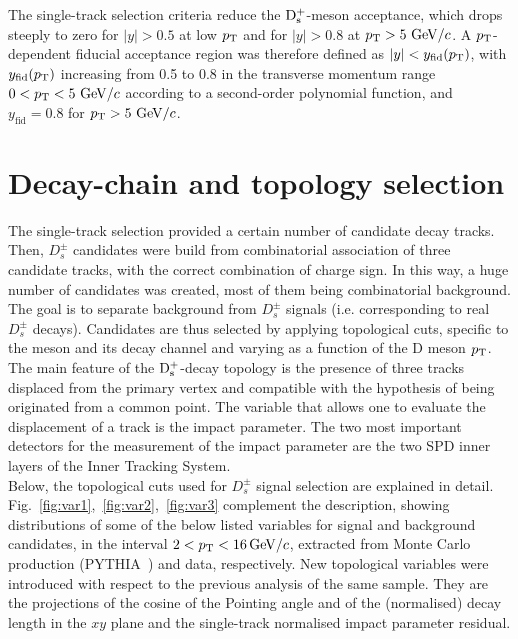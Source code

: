 The single-track selection criteria reduce the ${\rm D_s^+}$-meson acceptance, which drops 
steeply to zero for $|y| > 0.5$ at low $p_{\rm T}$ and for $|y| > 0.8$ 
at $p_{\rm T} > 5~\mathrm{GeV}/c$. A $p_{\rm T}$-dependent fiducial acceptance region was therefore defined as 
$|y| < y_{\mathrm{fid}}(p_{\rm T})$, with $y_{\mathrm{fid}}(p_{\rm T})$ increasing 
from 0.5 to 0.8 in the transverse momentum range $0 < p_{\rm T} < 5~\mathrm{GeV}/c$ 
according to a second-order polynomial function, and $y_{\mathrm{fid}}=0.8$ 
for $p_{\rm T} > 5~\mathrm{GeV}/c$.

\section{Decay-chain and topology selection}

The single-track selection provided a certain number of candidate
 decay tracks. Then, $D^{\pm}_s$ candidates were build from combinatorial 
 association of three candidate tracks, with the correct combination of charge 
 sign. In this way, a huge number of candidates was created, most of them 
 being combinatorial background. The goal is to separate background from
  $D^{\pm}_s$ signals (i.e. corresponding to real  $D^{\pm}_s$ decays). Candidates 
  are thus selected by applying topological cuts, specific to the meson and its 
  decay channel and varying as a function of the D meson $p_{\rm T}$.
The main feature of the ${\rm D_s^+}$-decay topology is the presence of three tracks displaced from 
the primary vertex and compatible with the hypothesis of being originated from 
a common point. 
The variable that allows one to evaluate the displacement of a track is the 
impact parameter. The two most important detectors for the measurement
 of the impact parameter are the two SPD inner layers of the Inner Tracking System. \\
Below, the topological cuts used for $D^{\pm}_s$ signal selection
 are explained in detail. Fig.~\ref{fig:var1},~\ref{fig:var2},~\ref{fig:var3} complement
 the description, showing distributions of some of the below listed variables
 for signal and background candidates, in the interval $2 < p_{\rm T} < 16 \, \mathrm{GeV}/c$, 
 extracted from Monte Carlo production (PYTHIA~\cite{Sjostrand:2006za}) and data, respectively.
  New topological variables were introduced with respect to the 
  previous analysis of the same sample. They are the projections of the cosine of 
the Pointing angle and of the (normalised) decay length in the $xy$ plane 
 and the single-track normalised impact parameter residual.
